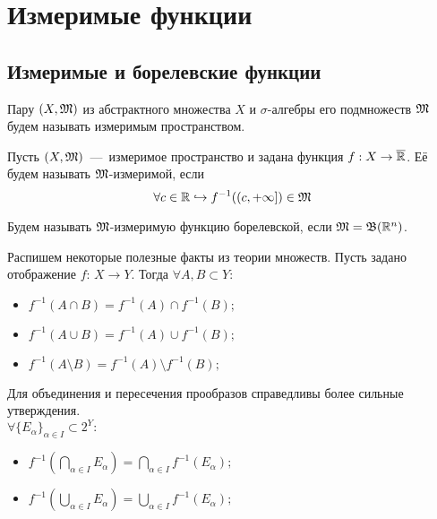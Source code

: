 \section{Измеримые функции}
\subsection{Измеримые и борелевские функции}
\begin{definition}
    Пару $(X, \mathfrak{M})$ из абстрактного множества $X$ и $\sigma$-алгебры его подмножеств $\mathfrak{M}$ будем называть измеримым пространством.
\end{definition}

\begin{definition}
    Пусть $(X, \mathfrak{M})$~---~измеримое пространство и задана функция $f: X \rightarrow \overline{\mathbb{R}}$. Её будем называть $\mathfrak{M}$-измеримой, если \[\forall c \in \mathbb{R} \hookrightarrow f^{-1}((c, +\infty]) \in \mathfrak{M}\]
\end{definition}

\begin{definition}
    Будем называть $\mathfrak{M}$-измеримую функцию борелевской, если $\mathfrak{M} = \mathfrak{B}(\mathbb{R}^n)$.
\end{definition}

\begin{note}
    Распишем некоторые полезные факты из теории множеств. Пусть задано отображение $f$: $X \rightarrow Y$. Тогда $\forall A, B \subset Y:$
    \begin{itemize}
        \item $f^{-1}(A \cap B) = f^{-1}(A) \cap f^{-1}(B);$
        \item $f^{-1}(A \cup B) = f^{-1}(A) \cup f^{-1}(B);$
        \item $f^{-1}(A \setminus B) = f^{-1}(A) \setminus f^{-1}(B);$
    \end{itemize}
    Для объединения и пересечения прообразов справедливы более сильные утверждения. \\ $\forall \{E_\alpha\}_{\alpha \in I} \subset 2^Y:$
    \begin{itemize}
        \item $f^{-1}(\bigcap\limits_{\alpha \in I} E_\alpha) = \bigcap\limits_{\alpha \in I} f^{-1}(E_\alpha);$
        \item $f^{-1}(\bigcup\limits_{\alpha \in I} E_\alpha) = \bigcup\limits_{\alpha \in I} f^{-1}(E_\alpha);$
    \end{itemize}
\end{note}

